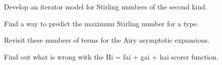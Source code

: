 \begin{DoxyRefList}
Develop an iterator model for Stirling numbers of the second kind.  
\item[\label{todo__todo000014}%
\Hypertarget{todo__todo000014}%
Member \hyperlink{namespacestd_1_1____detail_a8408f17699eb43a14447c7e4795b277f}{std\+:\+:\+\_\+\+\_\+detail\+:\+:\+\_\+\+\_\+stirling\+\_\+2\+\_\+series} (unsigned int \+\_\+\+\_\+n, unsigned int \+\_\+\+\_\+m)]Find a way to predict the maximum Stirling number for a type.  
\item[\label{todo__todo000007}%
\Hypertarget{todo__todo000007}%
Member \hyperlink{classstd_1_1____detail_1_1__Airy__asymp_a64bce3ed154b3268944ae20f324d64cd}{std\+:\+:\+\_\+\+\_\+detail\+:\+:\+\_\+\+Airy\+\_\+asymp$<$ \+\_\+\+Tp $>$\+:\+:\+\_\+\+S\+\_\+absarg\+\_\+lt\+\_\+pio3} (\+\_\+\+Cmplx \+\_\+\+\_\+z) const]Revisit these numbers of terms for the Airy asymptotic expansions.  
\item[\label{todo__todo000006}%
\Hypertarget{todo__todo000006}%
Member \hyperlink{classstd_1_1____detail_1_1__Airy__series_a71f68d64f0e202c4f98146f90c6b3298}{std\+:\+:\+\_\+\+\_\+detail\+:\+:\+\_\+\+Airy\+\_\+series$<$ \+\_\+\+Tp $>$\+:\+:\+\_\+\+S\+\_\+\+Scorer} (\+\_\+\+Cmplx \+\_\+\+\_\+t)]Find out what is wrong with the Hi = fai + gai + hai scorer function.
\end{DoxyRefList}